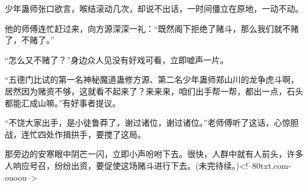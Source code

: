\begin{this_body}
少年蛊师张口欲言，喉结滚动几次，却说不出话，一时间僵立在原地，一动不动。

他的师傅连忙赶过来，向方源深深一礼：“既然阁下拒绝了赌斗，那么我们就不赌了，不赌了。”

“怎么又不赌了？”身边众人见没有好戏可看，立即嘘声一片。

“五德门比试的第一名神秘魔道蛊修方源、第二名少年蛊师郑山川的龙争虎斗啊，居然因为赌资不够，这就看不起来了？来来来，咱们出手帮一帮，都出一点，石头都能汇成山嘛。”有好事者提议。

“不饶大家出手，是小徒鲁莽了，谢过诸位，谢过诸位。”老师傅听了这话，心惊胆战，连忙四处作揖拱手，要搅了这局。

那旁边的安寒眼中阴芒一闪，立即小声吩咐下去。很快，人群中就有人前头，许多人响应号召，纷纷出资，要促使这场赌斗进行下去。(未完待续。)<!--80txt.com-ouoou-->

\end{this_body}

